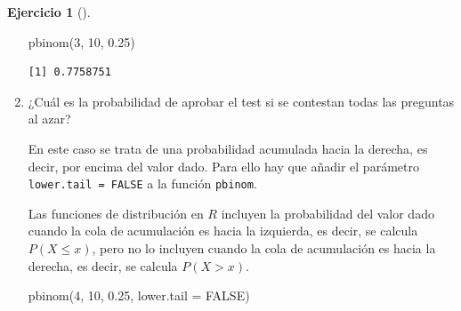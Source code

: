 \documentclass[
  a4paper,
]{scrreport}
\newenvironment{Shaded}{\begin{snugshade}}{\end{snugshade}}
\newcommand{\AttributeTok}[1]{\textcolor[rgb]{0.40,0.45,0.13}{#1}}
\newcommand{\ConstantTok}[1]{\textcolor[rgb]{0.56,0.35,0.01}{#1}}
\newcommand{\DecValTok}[1]{\textcolor[rgb]{0.68,0.00,0.00}{#1}}
\newcommand{\FloatTok}[1]{\textcolor[rgb]{0.68,0.00,0.00}{#1}}
\newcommand{\FunctionTok}[1]{\textcolor[rgb]{0.28,0.35,0.67}{#1}}
\newcommand{\NormalTok}[1]{\textcolor[rgb]{0.00,0.23,0.31}{#1}}
\theoremstyle{definition}
\newtheorem{exercise}{Ejercicio}[chapter]
\theoremstyle{remark}
\begin{document}
\begin{exercise}[]
\begin{enumerate}
\begin{tcolorbox}
\begin{Shaded}
\begin{Highlighting}[]
\FunctionTok{pbinom}\NormalTok{(}\DecValTok{3}\NormalTok{, }\DecValTok{10}\NormalTok{, }\FloatTok{0.25}\NormalTok{)}
\end{Highlighting}
\end{Shaded}

\begin{verbatim}
[1] 0.7758751
\end{verbatim}

  \end{tcolorbox}
\item
  ¿Cuál es la probabilidad de aprobar el test si se contestan todas las
  preguntas al azar?

  \begin{tcolorbox}[enhanced jigsaw, toprule=.15mm, rightrule=.15mm, arc=.35mm, colback=white, colbacktitle=quarto-callout-tip-color!10!white, toptitle=1mm, left=2mm, colframe=quarto-callout-tip-color-frame, opacityback=0, breakable, opacitybacktitle=0.6, bottomtitle=1mm, titlerule=0mm, title=\textcolor{quarto-callout-tip-color}{\faLightbulb}\hspace{0.5em}{Solución}, bottomrule=.15mm, coltitle=black, leftrule=.75mm]

  En este caso se trata de una probabilidad acumulada hacia la derecha,
  es decir, por encima del valor dado. Para ello hay que añadir el
  parámetro \texttt{lower.tail\ =\ FALSE} a la función \texttt{pbinom}.

  \begin{tcolorbox}[enhanced jigsaw, toprule=.15mm, rightrule=.15mm, arc=.35mm, colback=white, colbacktitle=quarto-callout-warning-color!10!white, toptitle=1mm, left=2mm, colframe=quarto-callout-warning-color-frame, opacityback=0, breakable, opacitybacktitle=0.6, bottomtitle=1mm, titlerule=0mm, title=\textcolor{quarto-callout-warning-color}{\faExclamationTriangle}\hspace{0.5em}{Advertencia}, bottomrule=.15mm, coltitle=black, leftrule=.75mm]

  Las funciones de distribución en \(R\) incluyen la probabilidad del
  valor dado cuando la cola de acumulación es hacia la izquierda, es
  decir, se calcula \(P(X\leq x)\), pero no lo incluyen cuando la cola
  de acumulación es hacia la derecha, es decir, se calcula \(P(X>x)\).

  \end{tcolorbox}

\begin{Shaded}
\begin{Highlighting}[]
\FunctionTok{pbinom}\NormalTok{(}\DecValTok{4}\NormalTok{, }\DecValTok{10}\NormalTok{, }\FloatTok{0.25}\NormalTok{, }\AttributeTok{lower.tail =} \ConstantTok{FALSE}\NormalTok{)}
\end{Highlighting}
\end{Shaded}


\end{tcolorbox}
\end{enumerate}
\end{exercise}
\end{document}
